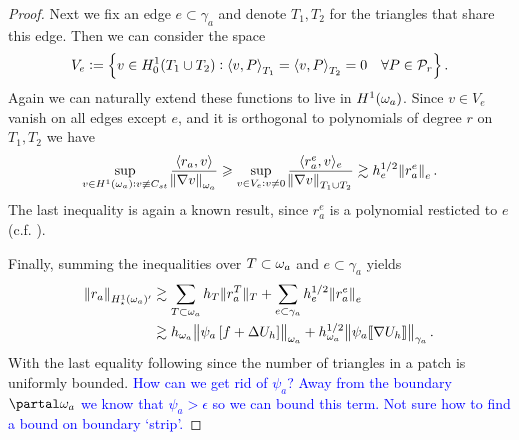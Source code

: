 \documentclass[thesis.tex]{subfiles}
\begin{document}
\begin{proof}
  Next we fix an edge $e \subset \gamma_a$ and denote $T_1, T_2$ for the triangles that share this edge. Then we can consider the space
  \[
  V_e := \set{v \in H_0^1(T_1 \cup T_2) : \left \langle v,P \right \rangle_{T_1}= \left \langle v,P \right \rangle_{T_2} = 0\quad \forall P \in \mathcal{P}_r}.\]
  Again we can naturally extend these functions to live in $H^1(\omega_a)$. Since $v \in V_e$ vanish on all edges except $e$, and
  it is orthogonal to polynomials of degree $r$ on $T_1, T_2$ we have
  \[
         \sup_{v \in H^1(\omega_a) : v \not \equiv C_{st}} { \left \langle r_a, v \right \rangle \over \norm{\nabla v}_{\omega_a}} 
         \geqslant \sup_{v \in V_e: v \ne 0} { \langle r^e_a, v \rangle_e \over \norm{\nabla v}_{T_1 \cup T_2}}
         \gtrsim h_e^{1/2} \norm{r^e_a}_e.
  \]
  The last inequality is again a known result, since $r^e_a$ is a polynomial resticted to $e$ (c.f. \cite[Ex~9.x.7]{brenner}).

  Finally, summing the inequalities over $T \subset \omega_a$ and $e \subset \gamma_a$ yields
  \begin{align*}
    \norm{r_a}_{H_\star^1(\omega_a)'} &\gtrsim \sum_{T \subset \omega_a} h_T \|{r^T_a}\|_T + \sum_{e \subset \gamma_a} h_e^{1/2} \norm{r^e_a}_e\\
    &\gtrsim h_{\omega_a} \norm{\psi_a \left[ f + \Delta U_h \right]}_{\omega_a} + h_{\omega_a}^{1/2} \norm{ \psi_a \llbracket \nabla U_h \rrbracket}_{\gamma_a}.
  \end{align*}
  With the last equality following since the number of triangles in a patch is uniformly bounded.
  \textcolor{blue}{How can we get rid of $\psi_a$? Away from the boundary $\partal \w_a$ we know that $\psi_a > \epsilon$ so we can bound this term. Not sure how to find a bound on boundary `strip'.}


\end{proof}
\end{document}
